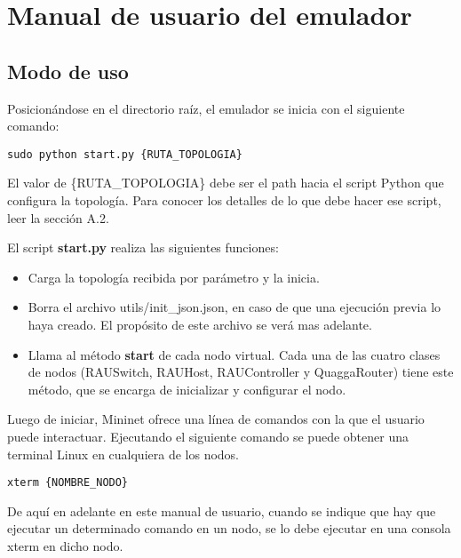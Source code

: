 
\graphicspath{{Appendix1/Figs/}}

\chapter{Manual de usuario del emulador}

\section{Modo de uso}
Posicionándose en el directorio raíz, el emulador se inicia con el siguiente comando:
\begin{lstlisting}
sudo python start.py {RUTA_TOPOLOGIA}
\end{lstlisting}

El valor de \{RUTA\_TOPOLOGIA\} debe ser el path hacia el script Python que configura la topología. Para conocer los detalles de lo que debe hacer ese script, leer la sección A.2.

El script \textbf{start.py} realiza las siguientes funciones:
\begin{itemize}
	\item Carga la topología recibida por parámetro y la inicia.
	\item Borra el archivo utils/init\_json.json, en caso de que una ejecución previa lo haya creado. El propósito de este archivo se verá mas adelante.
	\item Llama al método \textbf{start} de cada nodo virtual. Cada una de las cuatro clases de nodos (RAUSwitch, RAUHost, RAUController y QuaggaRouter) tiene este método, que se encarga de inicializar y configurar el nodo.
\end{itemize}

Luego de iniciar, Mininet ofrece una línea de comandos con la que el usuario puede interactuar. Ejecutando el siguiente comando se puede obtener una terminal Linux en cualquiera de los nodos.
\begin{lstlisting}
xterm {NOMBRE_NODO}
\end{lstlisting}

De aquí en adelante en este manual de usuario, cuando se indique que hay que ejecutar un determinado comando en un nodo, se lo debe ejecutar en una consola xterm en dicho nodo.

